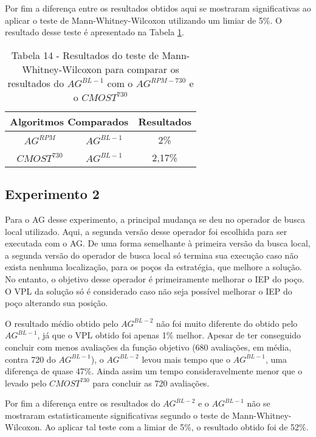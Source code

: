 Por fim a diferença entre os resultados obtidos aqui se mostraram significativas ao aplicar o teste de Mann-Whitney-Wilcoxon utilizando um limiar de 5\%. O resultado desse teste é apresentado na Tabela \ref{tab:mw6_2}.

\begin{table}[htb]
\centering
\caption{Tabela 14 - Resultados do teste de Mann-Whitney-Wilcoxon para comparar os resultados do $AG^{BL-1}$ com o $AG^{RPM-730}$ e o $CMOST^{730}$}
\label{tab:mw6_2}
\begin{tabular}{|c|c|c|}
\hline
\multicolumn{2}{|c|}{Algoritmos Comparados} & Resultados \\ \hline
$AG^{RPM}$  &  $AG^{BL-1}$ & 2\% \\ \hline
$CMOST^{730}$ & $AG^{BL-1}$ & 2,17\% \\ \hline

\end{tabular}
\end{table}

\subsection{Experimento 2}

Para o AG desse experimento, a principal mudança se deu no operador de busca local utilizado. Aqui, a segunda versão desse operador foi escolhida para ser executada com o AG. De uma forma semelhante à primeira versão da busca local, a segunda versão do operador de busca local só termina sua execução caso não exista nenhuma localização, para os poços da estratégia, que melhore a solução. No entanto, o objetivo desse operador é primeiramente melhorar o IEP do poço. O VPL da solução só é considerado caso não seja possível melhorar o IEP do poço alterando sua posição.

O resultado médio obtido pelo $AG^{BL-2}$ não foi muito diferente do obtido pelo $AG^{BL-1}$, já que o VPL obtido foi apenas 1\% melhor. Apesar de ter conseguido concluir com menos avaliações da função objetivo (680 avaliações, em média, contra 720 do $AG^{BL-1}$), o $AG^{BL-2}$ levou mais tempo que o $AG^{BL-1}$, uma diferença de quase 47\%. Ainda assim um tempo consideravelmente menor que o levado pelo $CMOST^{730}$ para concluir as 720 avaliações.

Por fim a diferença entre os resultados do $AG^{BL-2}$ e o $AG^{BL-1}$ não se mostraram estatisticamente significativas segundo o teste de Mann-Whitney-Wilcoxon. Ao aplicar tal teste com a limiar de 5\%, o resultado obtido foi de 52\%.